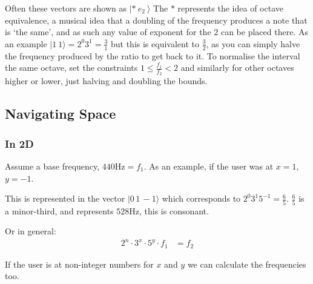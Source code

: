 Often these vectors are shown as $|*\ e_2\ \rangle$ The $*$ represents the idea
of octave equivalence, a musical idea that a doubling of the frequency produces
a note that is `the same', and as such any value of exponent for the $2$ can be
placed there. As an example $|1\ 1\rangle = 2^0 3^1 = \frac{3}{1}$ but this is
equivalent to $\frac{3}{2}$, as you can simply halve the frequency produced by
the ratio to get back to it. To normalise the interval the same octave, set the
constraints $1 \leq \frac{f_1}{f_2} < 2$ and similarly for other octaves higher
or lower, just halving and doubling the bounds.

\subsection{Navigating Space}
\subsubsection{In 2D}
Assume a base frequency, $440\si{\hertz} = f_1$. As an example, if the user was
at $x=1$, $y=-1$.

\begin{figure}[H]
    \centering
    \caption{}
\end{figure}

This is represented in the vector $|0\, 1\, -1\rangle$ which corresponds to $2^0
3^1 5^{-1} = \frac{6}{5}$. $\frac{6}{5}$ is a minor-third, and represents
$528\si{\hertz}$, this is consonant.

Or in general:
\begin{align*}
    2^n \cdot 3^x \cdot 5^y \cdot f_1 &= f_2
\end{align*}

If the user is at non-integer numbers for $x$ and $y$ we can calculate the frequencies too.
\begin{figure}[H]
    \centering
    \caption{}
    \label{outoftune}
\end{figure}


